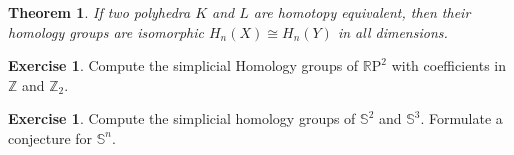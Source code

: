 \documentclass[a4paper,DIV10,10pt]{scrartcl}
\newcommand{\Z}{\ensuremath{\mathbb{Z}}}   %
\newcommand{\R}{\ensuremath{\mathbb{R}}}   %
\newtheorem{theorem}[satz]{Theorem}
\theoremstyle{definition}
\newtheorem{exercise}[satz]{Exercise}
\newtheorem{beispiel}[satz]{Beispiel}
\begin{document}
\begin{theorem}
	If two polyhedra $K$ and $L$ are homotopy equivalent, then their homology groups are isomorphic $H_n(X)\cong H_n(Y)$ in all dimensions.
\end{theorem}
  \begin{exercise}
    Compute the simplicial Homology groups of $\R \mathrm{P}^2$ with coefficients in $\Z$ and $\Z_2$.
  \end{exercise}
\begin{exercise}
	Compute the simplicial homology groups of $\mathbb{S}^2$ and $\mathbb{S}^3$. Formulate a conjecture for $\mathbb{S}^n$.
\end{exercise}
\end{document}
